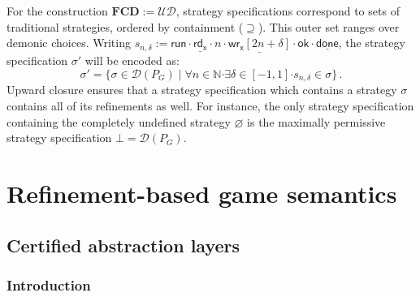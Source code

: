 \documentclass[draft,11pt]{report}
\theoremstyle{definition}
\newcommand{\kw}[1]{\ensuremath{ \mathsf{#1} }}
\newcommand{\bdot}{\boldsymbol{\cdot}}
\begin{document}
For the construction $\mathbf{FCD} := \mathcal{U} \mathcal{D}$,
strategy specifications correspond to
sets of traditional strategies,
ordered by containment ($\supseteq$).
This outer set ranges over demonic choices.
Writing
$
  s_{n,\delta} :=
        \kw{run} \cdot
        \underline{\kw{rd}_\kw{x}} \cdot n \cdot
        \underline{\kw{wr}_\kw{x}[2n + \delta]} \cdot \kw{ok} \cdot
        \underline{\kw{done}} %
$,
the strategy specification $\sigma'$
will be encoded as:
\[
  \sigma' =
  \{ \sigma \in \mathcal{D}(P_G) \mid
     \forall n \in \mathbb{N} \bdot
     \exists \delta \in [-1,1] \bdot
     s_{n,\delta} \in \sigma \} \,.
\]
Upward closure ensures that a strategy specification
which contains a strategy $\sigma$
contains all of its refinements as well.
For instance,
the only strategy specification
containing the completely undefined strategy $\varnothing$
is the maximally permissive strategy specification $\bot = \mathcal{D}(P_G)$.


%
%



\part{Refinement-based game semantics} \label{part:rbgs}

\chapter{Certified abstraction layers} \label{sec:cal} %

\section{Introduction} %
\end{document}
